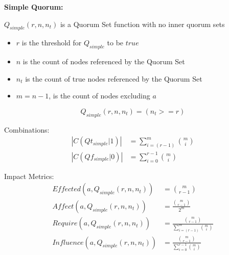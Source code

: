 \documentclass[10pt]{article}
\begin{document}
\newcommand{\powerset}[1]{\mathbb{P}(#1)}
\newcommand{\cardinality}[1]{\left\vert{#1}\right\vert}

\newcommand{\tgt}[0]{ \cardinality{ C(Qt|1) } }
\newcommand{\tgf}[0]{ \cardinality{ C(Qt|0) } }
\newcommand{\fgt}[0]{ \cardinality{ C(Qf|1) } }
\newcommand{\fgf}[0]{ \cardinality{ C(Qf|0) } }
\newcommand{\effected}[0]{ \tgt + \fgf - 2^m }

\setcounter{equation}{8}

\newcommand{\simpleCombinations}[0]{ \binom{m}{r-1} }




\textbf{Simple Quorum:}\\\par
$Q_{simple}(r,n,n_t)$ is a Quorum Set function with no inner quorum sets
\begin{itemize}
  \item $r$ is the threshold for $Q_{simple}$ to be $true$
  \item $n$ is the count of nodes referenced by the Quorum Set
  \item $n_t$ is the count of true nodes referenced by the Quorum Set
  \item $m = n-1$, is the count of nodes excluding $a$
\end{itemize}

\begin{equation}
  Q_{simple}(r,n,n_t) = (n_t>=r)
\end{equation}

Combinations:
\begin{align}
  \cardinality{ C(Qt_{simple}|1) } &= \sum_{i=(r-1)}^m \binom{m}{i} \\
  \cardinality{ C(Qf_{simple}|0) } &= \sum_{i=0}^{r-1} \binom{m}{i}
\end{align}

Impact Metrics:
\begin{align}
  Effected(a,Q_{simple}(r,n,n_t)) &= \simpleCombinations \\
  Affect(a,Q_{simple}(r,n,n_t)) &= \frac{ \simpleCombinations{} }{ 2^m } \\
  Require(a,Q_{simple}(r,n,n_t)) &= \frac{ \simpleCombinations{} }{ \sum_{i=(r-1)}^{m} \binom{m}{i} } \\
  Influence(a,Q_{simple}(r,n,n_t)) &= \frac{ \simpleCombinations{} }{ \sum_{i=0}^{r-1} \binom{m}{i} }
\end{align}
\end{document}
